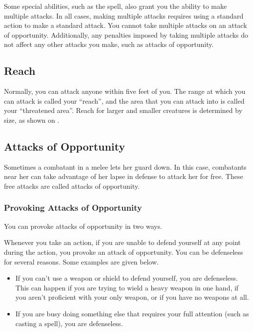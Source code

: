 Some special abilities, such as the  spell, also grant you the ability to make multiple attacks. In all cases, making multiple attacks requires using a standard action to make a standard attack. You cannot take multiple attacks on an attack of opportunity. Additionally, any penalties imposed by taking multiple attacks do not affect any other attacks you make, such as attacks of opportunity.

\subsection{Reach}\label{Reach}
Normally, you can attack anyone within five feet of you. The range at which you can attack is called your ``reach'', and the area that you can attack into is called your ``threatened area''. Reach for larger and smaller creatures is determined by size, as shown on .

\subsection{Attacks of Opportunity}\label{Attacks of Opportunity}
Sometimes a combatant in a melee lets her guard down. In this case, combatants near her can take advantage of her lapse in defense to attack her for free. These free attacks are called attacks of opportunity.

\subsubsection{Provoking Attacks of Opportunity}
You can provoke attacks of opportunity in two ways.

\label{Being Defenseless} Whenever you take an action, if you are unable to defend yourself at any point during the action, you provoke an attack of opportunity. You can be defenseless for several reasons. Some examples are given below.

\begin{itemize}
    \item If you can't use a weapon or shield to defend yourself, you are defenseless. This can happen if you are trying to wield a heavy weapon in one hand, if you aren't proficient with your only weapon, or if you have no weapons at all. 
    \item If you are busy doing something else that requires your full attention (such as casting a spell), you are defenseless.
\end{itemize}

